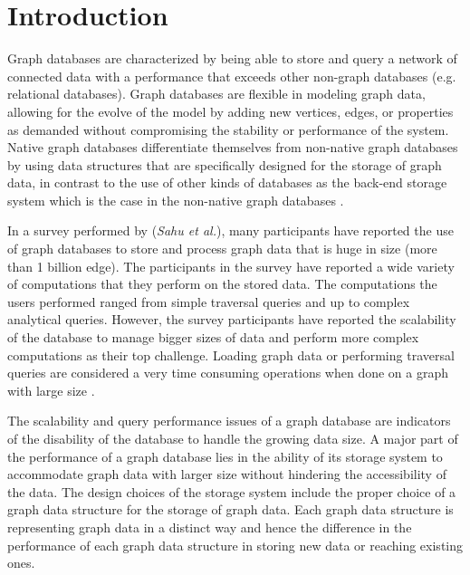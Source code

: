 {\chapter{Introduction}
\label{chap:Introduction}

Graph databases are characterized by being able to store and query a network of connected data with a performance that exceeds other non-graph databases (e.g. relational databases). Graph databases are flexible in modeling graph data, allowing for the evolve of the model by adding new vertices, edges, or properties as demanded without compromising the stability or performance of the system. Native graph databases differentiate themselves from non-native graph databases by using data structures that are specifically designed for the storage of graph data, in contrast to the use of other kinds of databases as the back-end storage system which is the case in the non-native graph databases \cite{robinson2013graph}. 

In a survey performed by (\textit{Sahu et al.}), many participants have reported the use of graph databases to store and process graph data that is huge in size (more than 1 billion edge). The participants in the survey have reported a wide variety of computations that they perform on the stored data. The computations the users performed ranged from simple traversal queries and up to complex analytical queries. However, the survey participants have reported the scalability of the database to manage bigger sizes of data and perform more complex computations as their top challenge. Loading graph data or performing traversal queries are considered a very time consuming operations when done on a graph with large size \cite{sahu2017ubiquity}.

The scalability and query performance issues of a graph database are indicators of the disability of the database to handle the growing data size. A major part of the performance of a graph database lies in the ability of its storage system to accommodate graph data with larger size without hindering the accessibility of the data. The design choices of the storage system include the proper choice of a graph data structure for the storage of graph data. Each graph data structure is representing graph data in a distinct way and hence the difference in the performance of each graph data structure in storing new data or reaching existing ones.\\


}
